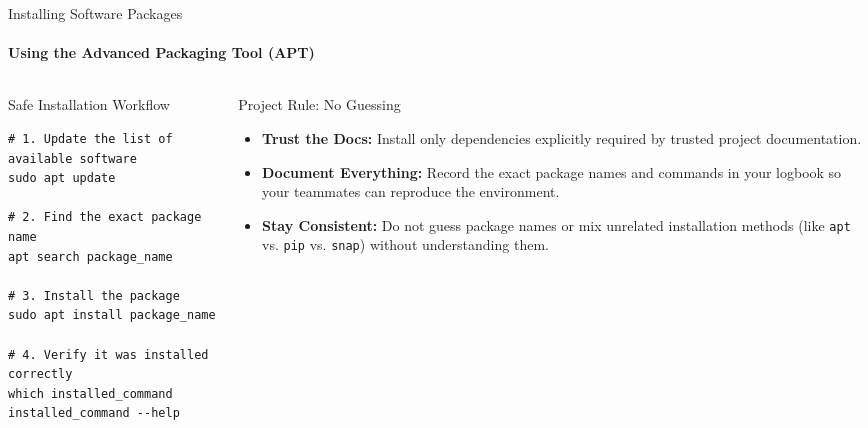 \begin{frame}[fragile]{Installing Software Packages}
\framesubtitle{Using the Advanced Packaging Tool (APT)}

\footnotesize

\begin{columns}[T,onlytextwidth]

    \begin{column}{0.48\textwidth}
        \begin{exampleblock}{Safe Installation Workflow}
\begin{verbatim}
# 1. Update the list of available software
sudo apt update

# 2. Find the exact package name
apt search package_name

# 3. Install the package
sudo apt install package_name

# 4. Verify it was installed correctly
which installed_command
installed_command --help
\end{verbatim}
        \end{exampleblock}
    \end{column}

    \begin{column}{0.48\textwidth}
        \begin{alertblock}{Project Rule: No Guessing}
            \begin{itemize}
                \setlength{\itemsep}{0.4em}
                \item \textbf{Trust the Docs:} Install only dependencies explicitly required by trusted project documentation.
                \item \textbf{Document Everything:} Record the exact package names and commands in your logbook so your teammates can reproduce the environment.
                \item \textbf{Stay Consistent:} Do not guess package names or mix unrelated installation methods (like \texttt{apt} vs. \texttt{pip} vs. \texttt{snap}) without understanding them.
            \end{itemize}
        \end{alertblock}
    \end{column}

\end{columns}

\end{frame}


